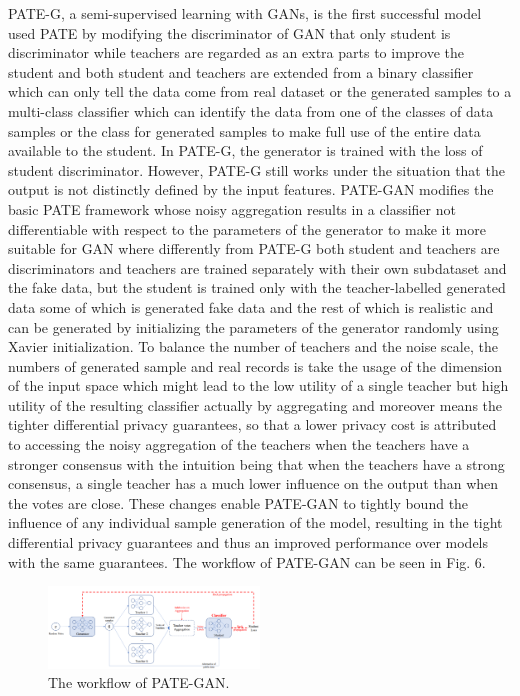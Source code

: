 \documentclass[conference]{IEEEtran}
\begin{document}
PATE-G\cite{b23}, a semi-supervised learning with GANs, is the first successful model used PATE by modifying the discriminator of GAN that only student is discriminator while teachers are regarded as an extra parts to improve the student and both student and teachers are extended from a binary classifier which can only tell the data come from real dataset or the generated samples to a multi-class classifier which can identify the data from one of the classes of data samples or the class for generated samples to make full use of the entire data available to the student. In PATE-G, the generator is trained with the loss of student discriminator. However, PATE-G still works under the situation that the output is not distinctly defined by the input features.  PATE-GAN\cite{b34} modifies the basic PATE framework whose noisy aggregation results in a classifier not differentiable with respect to the parameters of the generator to make it more suitable for GAN where differently from PATE-G both student and teachers are discriminators and teachers are trained separately with their own subdataset and the fake data, but the student is trained only with the teacher-labelled generated data some of which is generated fake data and the rest of which is realistic and can be generated by initializing the parameters of the generator randomly using Xavier initialization. To balance the number of teachers and the noise scale, the numbers of generated sample and real records is take the usage of the dimension of the input space which might lead to the low utility of a single teacher but high utility of the resulting classifier actually by aggregating and moreover means the tighter differential privacy guarantees, so that a lower privacy cost is attributed to accessing the noisy aggregation of the teachers when the teachers have a stronger consensus with the intuition being that when the teachers have a strong consensus, a single teacher has a much lower influence on the output than when the votes are close. These changes enable PATE-GAN to tightly bound the influence of any individual sample generation of the model, resulting in the tight differential privacy guarantees and thus an improved performance over models with the same guarantees. The workflow of PATE-GAN can be seen in Fig. 6.
\begin{figure}[htbp]
    \centerline{\includegraphics[width=0.5\textwidth,height=0.2\textwidth]{PATE-GAN.png}}
    \caption{The workflow of PATE-GAN.}
    \label{fig6}
\end{figure}\\
\end{document}
